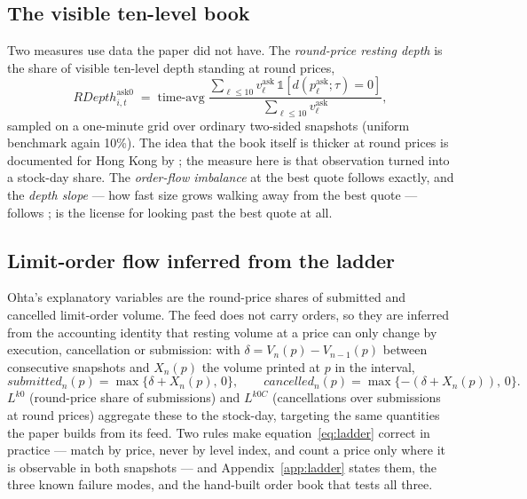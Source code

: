 \subsection{The visible ten-level book}

Two measures use data the paper did not have. The \emph{round-price resting
depth} is the share of visible ten-level depth standing at round prices,
%
\begin{equation}
\mathit{RDepth}^{\mathrm{ask}0}_{i,t} \;=\;
\text{time-avg}\;
\frac{\sum_{\ell \le 10} v^{\mathrm{ask}}_{\ell}\,
      \mathbb{1}[d(p^{\mathrm{ask}}_{\ell};\tau) = 0]}
     {\sum_{\ell \le 10} v^{\mathrm{ask}}_{\ell}},
\label{eq:rdepth}
\end{equation}
%
sampled on a one-minute grid over ordinary two-sided snapshots (uniform
benchmark again 10\%). The idea that the book itself is thicker at round
prices is documented for Hong Kong by \textcite{AhnCaiCheung2005}; the measure
here is that observation turned into a stock-day share. The \emph{order-flow
imbalance} at the best quote follows \textcite{ContKukanovStoikov2014}
exactly, and the \emph{depth slope} --- how fast size grows walking away from
the best quote --- follows \textcite{NaesSkjeltorp2006};
\textcite{CaoHanschWang2009} is the license for looking past the best quote at
all.

\subsection{Limit-order flow inferred from the ladder}

Ohta's explanatory variables are the round-price shares of submitted and
cancelled limit-order volume. The feed does not carry orders, so they are
inferred from the accounting identity that resting volume at a price can only
change by execution, cancellation or submission: with
$\delta = V_n(p) - V_{n-1}(p)$ between consecutive snapshots and $X_n(p)$ the
volume printed at $p$ in the interval,
%
\begin{equation}
\mathit{submitted}_n(p) = \max\{\delta + X_n(p),\, 0\}, \qquad
\mathit{cancelled}_n(p) = \max\{-(\delta + X_n(p)),\, 0\}.
\label{eq:ladder}
\end{equation}
%
$L^{k0}$ (round-price share of submissions) and $L^{k0C}$ (cancellations over
submissions at round prices) aggregate these to the stock-day, targeting the
same quantities the paper builds from its feed. Two rules make
equation~\eqref{eq:ladder} correct in practice --- match by price, never by
level index, and count a price only where it is observable in both snapshots
--- and Appendix~\ref{app:ladder} states them, the three known failure modes,
and the hand-built order book that tests all three.

